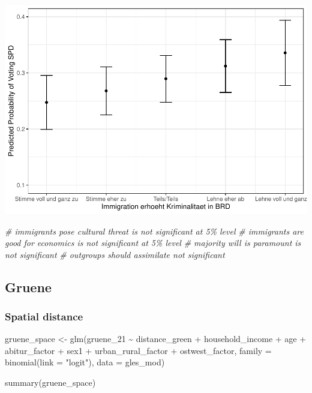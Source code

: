 \documentclass[
]{article}
\newenvironment{Shaded}{\begin{snugshade}}{\end{snugshade}}
\newcommand{\AttributeTok}[1]{\textcolor[rgb]{0.77,0.63,0.00}{#1}}
\newcommand{\CommentTok}[1]{\textcolor[rgb]{0.56,0.35,0.01}{\textit{#1}}}
\newcommand{\FunctionTok}[1]{\textcolor[rgb]{0.00,0.00,0.00}{#1}}
\newcommand{\NormalTok}[1]{#1}
\newcommand{\OtherTok}[1]{\textcolor[rgb]{0.56,0.35,0.01}{#1}}
\newcommand{\SpecialCharTok}[1]{\textcolor[rgb]{0.00,0.00,0.00}{#1}}
\newcommand{\StringTok}[1]{\textcolor[rgb]{0.31,0.60,0.02}{#1}}
\begin{document}
\includegraphics{AVCD_Final_Assignment-Edenhofer_files/figure-latex/spd-immig-crime-1.pdf}

\begin{Shaded}
\begin{Highlighting}[]
\CommentTok{\# immigrants pose cultural threat is not significant at 5\% level }
\CommentTok{\# immigrants are good for economics is not significant at 5\% level }
\CommentTok{\# majority will is paramount is not significant }
\CommentTok{\# outgroups should assimilate not significant }
\end{Highlighting}
\end{Shaded}

\hypertarget{gruene}{%
\subsection{Gruene}\label{gruene}}

\hypertarget{spatial-distance}{%
\subsubsection{Spatial distance}\label{spatial-distance}}

\begin{Shaded}
\begin{Highlighting}[]
\NormalTok{gruene\_space }\OtherTok{\textless{}{-}} \FunctionTok{glm}\NormalTok{(gruene\_21 }\SpecialCharTok{\textasciitilde{}}\NormalTok{ distance\_green }\SpecialCharTok{+}\NormalTok{ household\_income }\SpecialCharTok{+}\NormalTok{ age }\SpecialCharTok{+}\NormalTok{ abitur\_factor }\SpecialCharTok{+}\NormalTok{ sex1 }\SpecialCharTok{+}\NormalTok{ urban\_rural\_factor }\SpecialCharTok{+}\NormalTok{ ostwest\_factor, }\AttributeTok{family =} \FunctionTok{binomial}\NormalTok{(}\AttributeTok{link =} \StringTok{"logit"}\NormalTok{), }\AttributeTok{data =}\NormalTok{ gles\_mod)}


\FunctionTok{summary}\NormalTok{(gruene\_space)}
\end{Highlighting}
\end{Shaded}
\end{document}
